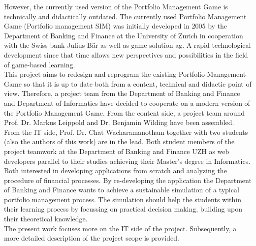 However, the currently used version of the Portfolio Management Game is technically and didactically outdated. The currently used Portfolio Management Game (Portfolio management SIM) was initially developed in 2005 by the Department of Banking and Finance at the University of Zurich in cooperation with the Swiss bank Julius Bär as well as game solution ag. A rapid technological development since that time allows new perspectives and possibilities in the field of game-based learning.\\


This project aims to redesign and reprogram the existing Portfolio Management Game so that it is up to date both from a content, technical and didactic point of view. Therefore, a project team from the Department of Banking and Finance and Department of Informatics have decided to cooperate on a modern version of the Portfolio Management Game. From the content side, a project team around Prof. Dr. Markus Leippold and Dr. Benjamin Wilding have been assembled. From the IT side, Prof. Dr. Chat Wacharamanotham together with two students (also the authors of this work) are in the lead. Both student members of the project teamwork at the Department of Banking and Finance UZH as web developers parallel to their studies achieving their Master’s degree in Informatics. Both interested in developing applications from scratch and analyzing the procedure of financial processes. By re-developing the application the Department of Banking and Finance wants to achieve a sustainable simulation of a typical portfolio management process. The simulation should help the students within their learning process by focussing on practical decision making, building upon their theoretical knowledge. \\

The present work focuses more on the IT side of the project. Subsequently, a more detailed description of the project scope is provided.
